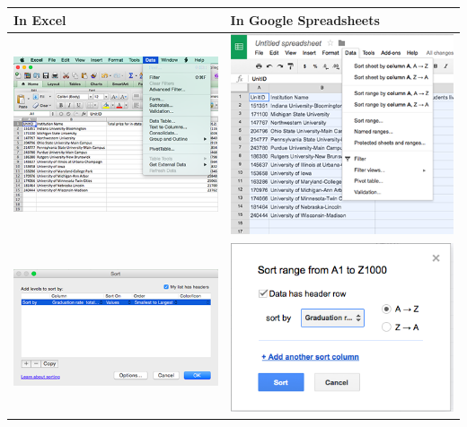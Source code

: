\documentclass[
]{book}
\begin{document}
\begin{longtable}[]{@{}ll@{}}
\toprule
In Excel & In Google Spreadsheets \\
\midrule
\endhead
\includegraphics{images/excelsort1.png} & \includegraphics{images/googlesort1.png} \\
\includegraphics{images/excelsort2.png} & \includegraphics{images/googlesort2.png} \\
\bottomrule
\end{longtable}
\end{document}

